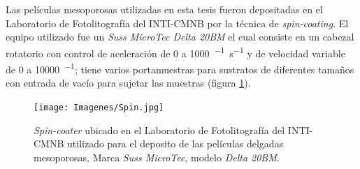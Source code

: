 			Las películas mesoporosas utilizadas en esta tesis fueron depositadas en el Laboratorio de Fotolitografía del INTI-CMNB por la técnica de \textit{spin-coating}. El equipo utilizado fue un \textit{Suss MicroTec Delta 20BM} el cual consiste en un cabezal rotatorio con control de aceleración de 0 a  \SI{1000}{\min^{-1}.\second^{-1}} y de velocidad variable de 0 a  \SI{10000}{\min^{-1}}; tiene varios portamuestras para sustratos de diferentes tamaños con entrada de vacío para sujetar las muestras (figura \ref{fig:spin}). 
					  \begin{figure}[ht]
					  \begin{center}
					  \texttt{[image: Imagenes/Spin.jpg]}
					  \caption[Equipo para el depósito de películas delgadas, \textit{spin-coater}]{\textit{Spin-coater} ubicado en el Laboratorio de Fotolitografía del INTI-CMNB utilizado para el deposito de las películas delgadas mesoporosas, Marca \textit{Suss MicroTec}, modelo \textit{Delta 20BM}.}
					  \label{fig:spin}
					  \end{center}
					  \end{figure}

